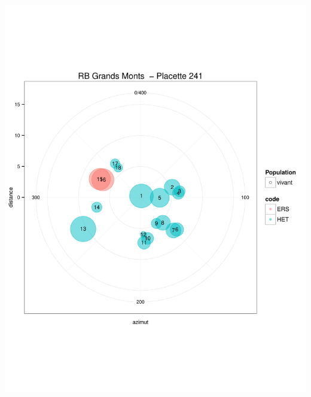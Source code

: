 \documentclass[a4paper]{book}\usepackage[]{graphicx}\usepackage[]{color}
\makeatletter
\def\maxwidth{ %
  \ifdim\Gin@nat@width>\linewidth
    \linewidth
  \else
    \Gin@nat@width
  \fi
}
\newenvironment{knitrout}{}{} %
\makeatother
\begin{document}
\begin{knitrout}
{\centering \includegraphics[width=\maxwidth]{Figures/PlanArbres-25} 

}





\end{knitrout}
\end{document}
